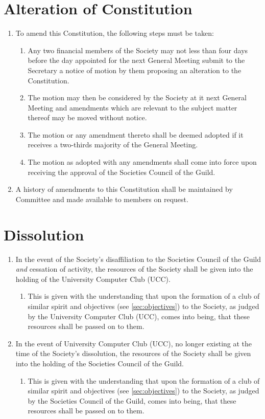 \documentclass[a4paper]{article}
\begin{document}
\section{Alteration of Constitution}
\begin{enumerate}
    \item To amend this Constitution, the following steps must be taken:
    \begin{enumerate}
        \item Any two financial members of the Society may not less than four days before the day appointed for the next General Meeting submit to the Secretary a notice of motion by them proposing an alteration to the Constitution.
        \item The motion may then be considered by the Society at it next General Meeting and amendments which are relevant to the subject matter thereof may be moved without notice.
        \item The motion or any amendment thereto shall be deemed adopted if it receives a two-thirds majority of the General Meeting.
        \item The motion as adopted with any amendments shall come into force upon receiving the approval of the Societies Council of the Guild.
    \end{enumerate}
    \item A history of amendments to this Constitution shall be maintained by Committee and made available to members on request.
\end{enumerate}


\section{Dissolution} \label{sec:dissolution}
\begin{enumerate}
    \item In the event of the Society's disaffiliation to the Societies Council of the Guild \emph{and} cessation of activity, the resources of the Society shall be given into the holding of the University Computer Club (UCC).
    \begin{enumerate}
        \item This is given with the understanding that upon the formation of a club of similar spirit and objectives (see \cref{sec:objectives}) to the Society, as judged by the University Computer Club (UCC), comes into being, that these resources shall be passed on to them.
    \end{enumerate}
    \item In the event of University Computer Club (UCC), no longer existing at the time of the Society's dissolution, the resources of the Society shall be given into the holding of the Societies Council of the Guild.
    \begin{enumerate}
        \item This is given with the understanding that upon the formation of a club of similar spirit and objectives (see \cref{sec:objectives}) to the Society, as judged by the Societies Council of the Guild, comes into being, that these resources shall be passed on to them.
    \end{enumerate}
\end{enumerate}
\end{document}
